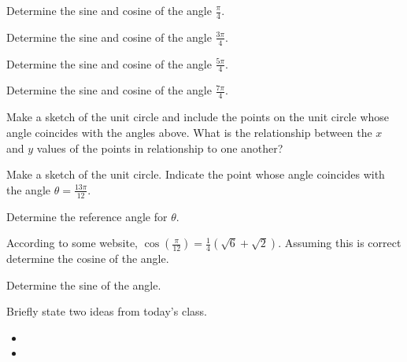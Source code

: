 
\begin{problem}
\item Determine the sine and cosine of the angle $\frac{\pi}{4}$.
  \vfill
\item Determine the sine and cosine of the angle $\frac{3\pi}{4}$.
  \vfill
\item Determine the sine and cosine of the angle $\frac{5\pi}{4}$.
  \vfill
\item Determine the sine and cosine of the angle $\frac{7\pi}{4}$.
  \vfill
\item Make a sketch of the unit circle and include the points on the
  unit circle whose angle coincides with the angles above. What is the
  relationship between the $x$ and $y$ values of the points in relationship
  to one another?
  \vfill
\end{problem}


\begin{problem}
\item Make a sketch of the unit circle. Indicate the point whose angle
  coincides with the angle $\theta=\frac{13\pi}{12}$.
  \begin{subproblem}
    \item Determine the reference angle for $\theta$.
      \vfill
    \item According to some website,
    $\displaystyle{\cos\left(\frac{\pi}{12}\right)=\frac{1}{4}\left( \sqrt{6} + \sqrt{2}\right)}$.
    Assuming this is correct determine the cosine of the angle.
      \vfill
    \item Determine the sine of the angle.
      \vfill
  \end{subproblem}

  \clearpage

  
\end{problem}

\postClass

\begin{problem}
\item Briefly state two ideas from today's class.
  \begin{itemize}
  \item
  \item
  \end{itemize}
\item
  \begin{subproblem}
    \item
  \end{subproblem}
\end{problem}


